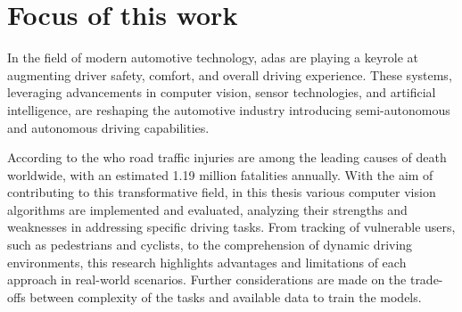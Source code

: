



\section{Focus of this work}
%
In the field of modern automotive technology, \ac{adas} are playing a keyrole at augmenting driver safety, comfort, and overall driving experience.
These systems, leveraging advancements in computer vision, sensor technologies, and artificial intelligence, are reshaping the automotive industry introducing semi-autonomous and autonomous driving capabilities.

According to the \ac{who} road traffic injuries are among the leading causes of death worldwide, with an estimated 1.19 million fatalities annually.
With the aim of contributing to this transformative field, in this thesis various computer vision algorithms are implemented and evaluated, analyzing their strengths and weaknesses in addressing specific driving tasks.
From tracking of vulnerable users, such as pedestrians and cyclists, to the comprehension of dynamic driving environments, this research highlights advantages and limitations of each approach in real-world scenarios.
Further considerations are made on the trade-offs between complexity of the tasks and available data to train the models. 

